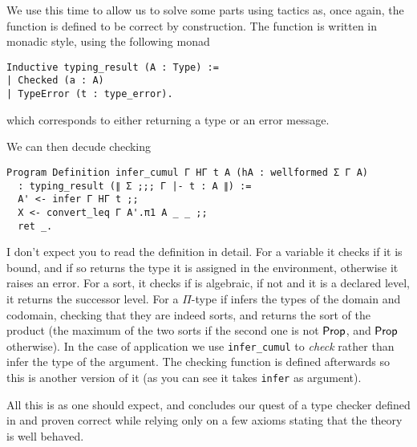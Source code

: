 We use \Program this time to allow us to solve some parts using tactics as,
once again, the function is defined to be correct by construction.
The function is written in monadic style, using the following monad
\begin{verbatim}
Inductive typing_result (A : Type) :=
| Checked (a : A)
| TypeError (t : type_error).
\end{verbatim}
which corresponds to either returning a type or an error message.

We can then decude checking
\begin{verbatim}
Program Definition infer_cumul Γ HΓ t A (hA : wellformed Σ Γ A)
  : typing_result (∥ Σ ;;; Γ |- t : A ∥) :=
  A' <- infer Γ HΓ t ;;
  X <- convert_leq Γ A'.π1 A _ _ ;;
  ret _.
\end{verbatim}

I don't expect you to read the definition in detail. For a variable it checks if
it is bound, and if so returns the type it is assigned in the environment,
otherwise it raises an error.
For a sort, it checks if is algebraic, if not and it is a declared level,
it returns the successor level.
For a \(\Pi\)-type if infers the types of the domain and codomain, checking that
they are indeed sorts, and returns the sort of the product (\ie the maximum
of the two sorts if the second one is not \(\mathsf{Prop}\), and \(\mathsf{Prop}\) otherwise).
In the case of application we use \texttt{infer_cumul} to \emph{check}
rather than infer the type of the argument. The checking function is defined
afterwards so this is another version of it (as you can see it takes
\texttt{infer} as argument).

All this is as one should expect, and concludes our quest of a type checker
defined in \Coq and proven correct while relying only on a few axioms stating
that the theory is well behaved.